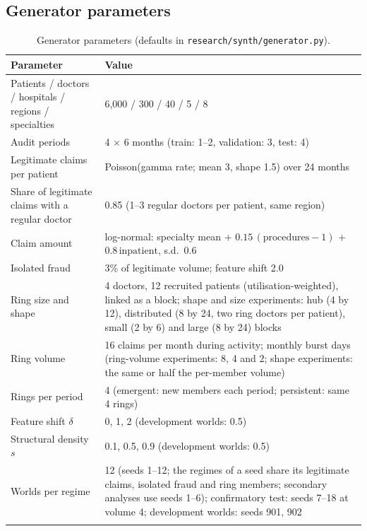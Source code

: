 \documentclass[pdflatex,sn-vancouver-num]{sn-jnl}
\begin{document}
\begin{appendices}
\renewcommand{\theHtable}{app.\arabic{table}}

\section{Generator parameters}\label{app:generator}

\begin{table}[h]
\caption{Generator parameters (defaults in \texttt{research/synth/generator.py}).}\label{tab:generator}
\scriptsize
\begin{tabular}{@{}p{}p{}@{}}
\toprule
Parameter & Value \\
\midrule
Patients / doctors / hospitals / regions / specialties & 6{,}000 / 300 / 40 / 5 / 8 \\
Audit periods & 4 $\times$ 6 months (train: 1--2, validation: 3, test: 4) \\
Legitimate claims per patient & Poisson(gamma rate; mean 3, shape 1.5) over 24 months \\
Share of legitimate claims with a regular doctor & 0.85 (1--3 regular doctors per patient, same region) \\
Claim amount & log-normal: specialty mean + $0.15\,(\text{procedures}-1)$ + $0.8\,\text{inpatient}$, s.d.\ 0.6 \\
Isolated fraud & 3\% of legitimate volume; feature shift 2.0 \\
Ring size and shape & 4 doctors, 12 recruited patients (utilisation-weighted), linked as a block; shape and size experiments: hub (4 by 12), distributed (8 by 24, two ring doctors per patient), small (2 by 6) and large (8 by 24) blocks \\
Ring volume & 16 claims per month during activity; monthly burst days (ring-volume experiments: 8, 4 and 2; shape experiments: the same or half the per-member volume) \\
Rings per period & 4 (emergent: new members each period; persistent: same 4 rings) \\
Feature shift $\delta$ & 0, 1, 2 (development worlds: 0.5) \\
Structural density $s$ & 0.1, 0.5, 0.9 (development worlds: 0.5) \\
Worlds per regime & 12 (seeds 1--12; the regimes of a seed share its legitimate claims, isolated fraud and ring members; secondary analyses use seeds 1--6); confirmatory test: seeds 7--18 at volume 4; development worlds: seeds 901, 902 \\
\botrule
\end{tabular}
\end{table}

\end{appendices}
\end{document}
